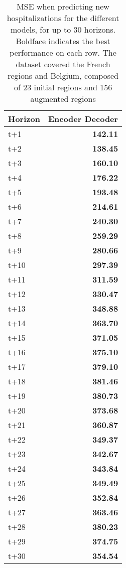 \begin{table}[H]
\centering
\caption{MSE when predicting new hospitalizations for the different models, for up to 30 horizons. Boldface indicates the best performance on each row. The dataset covered the French regions and Belgium, composed of 23 initial regions and 156 augmented regions }
\label{tab:MSE_comparison}
\begin{tabular}{lr}
\toprule
Horizon &  Encoder Decoder \\
\midrule
t+1  & \textbf{142.11}  \\
t+2  & \textbf{138.45}  \\
t+3  & \textbf{160.10}  \\
t+4  & \textbf{176.22}  \\
t+5  & \textbf{193.48}  \\
t+6  & \textbf{214.61}  \\
t+7  & \textbf{240.30}  \\
t+8  & \textbf{259.29}  \\
t+9  & \textbf{280.66}  \\
t+10  & \textbf{297.39}  \\
t+11  & \textbf{311.59}  \\
t+12  & \textbf{330.47}  \\
t+13  & \textbf{348.88}  \\
t+14  & \textbf{363.70}  \\
t+15  & \textbf{371.05}  \\
t+16  & \textbf{375.10}  \\
t+17  & \textbf{379.10}  \\
t+18  & \textbf{381.46}  \\
t+19  & \textbf{380.73}  \\
t+20  & \textbf{373.68}  \\
t+21  & \textbf{360.87}  \\
t+22  & \textbf{349.37}  \\
t+23  & \textbf{342.67}  \\
t+24  & \textbf{343.84}  \\
t+25  & \textbf{349.49}  \\
t+26  & \textbf{352.84}  \\
t+27  & \textbf{363.46}  \\
t+28  & \textbf{380.23}  \\
t+29  & \textbf{374.75}  \\
t+30  & \textbf{354.54}  \\

\bottomrule
\end{tabular}
\end{table}
